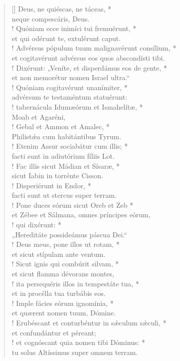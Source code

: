 \begin{verse}[\versewidth]
Deus, ne quiéscas, ne táceas, *\\
neque compescáris, Deus.\\!
\vin Quóniam ecce inimíci tui fremuérunt, *\\
\vin et qui odérunt te, extulérunt caput.\\!
Advérsus pópulum tuum malignavérunt consílium, *\\
et cogitavérunt advérsus eos quos abscondísti tibi.\\!
\vin Dixérunt: „Veníte, et disperdámus eos de gente, *\\
\vin et non memorétur nomen Israel ultra.“\\!
Quóniam cogitavérunt unanímiter, *\\
advérsum te testaméntum statuérunt:\\!
\vin tabernácula Idumæórum et Ismahelítæ, *\\
\vin Moab et Agaréni,\\!
Gebal et Ammon et Amalec, *\\
Philist\'{æ}a cum habitántibus Tyrum.\\!
\vin Etenim Assur sociabátur cum illis; *\\
\vin facti sunt in adiutórium fíliis Lot.\\!
Fac illis sicut Mádian et Sísaræ, *\\
sicut Iabin in torrénte Cisson.\\!
\vin Disperiérunt in Endor, *\\
\vin facti sunt ut stercus super terram.\\!
Pone duces eórum sicut Oreb et Zeb *\\
et Zébee et Sálmana, omnes príncipes eórum,\\!
\vin qui dixérunt: *\\
\vin „Hereditáte possideámus páscua Dei.“\\!
Deus meus, pone illos ut rotam, *\\
et sicut stípulam ante ventum.\\!
\vin Sicut ignis qui combúrit silvam, *\\
\vin et sicut flamma dévorans montes,\\!
ita persequéris illos in tempestáte tua, *\\
et in procélla tua turbábis eos.\\!
\vin Imple fácies eórum ignomínia, *\\
\vin et quærent nomen tuum, Dómine.\\!
Erubéscant et conturbéntur in s\'{æ}culum s\'{æ}culi, *\\
et confundántur et péreant;\\!
\vin et cognóscant quia nomen tibi Dóminus: *\\
\vin tu solus Altíssimus super omnem terram.\\
\end{verse}
\vspace{1cm}


